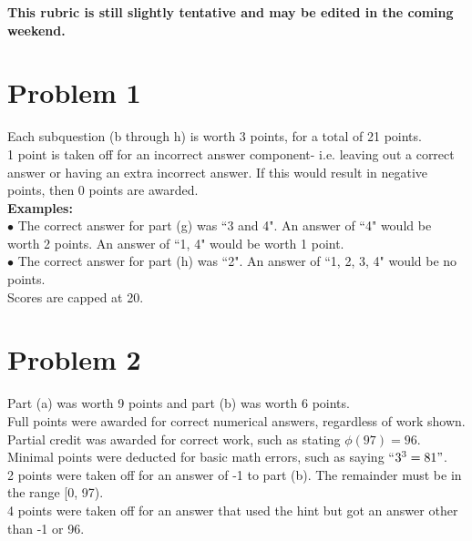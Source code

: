 \documentclass{article}
\begin{document}

\textbf{This rubric is still slightly tentative and may be edited in the coming weekend.}
\section*{Problem 1}
Each subquestion (b through h) is worth 3 points, for a total of 21 points. 
\\1 point is taken off for an incorrect answer component- i.e. leaving out a correct answer or having an extra incorrect answer. If this would result in negative points, then 0 points are awarded. 
\\ \textbf{Examples:}
\\ $\bullet$ The correct answer for part (g) was ``3 and 4". An answer of ``4" would be worth 2 points. An answer of ``1, 4" would be worth 1 point.
\\ $\bullet$ The correct answer for part (h) was ``2". An answer of ``1, 2, 3, 4" would be no points. 
\\Scores are capped at 20.  

\section*{Problem 2}
Part (a) was worth 9 points and part (b) was worth 6 points.
\\Full points were awarded for correct numerical answers, regardless of work shown. 
\\Partial credit was awarded for correct work, such as stating $\phi(97) = 96$.
\\Minimal points were deducted for basic math errors, such as saying ``$3^3 = 81"$. 
\\2 points were taken off for an answer of -1 to part (b). The remainder must be in the range [0, 97). 
\\4 points were taken off for an answer that used the hint but got an answer other than -1 or 96.
\end{document}
